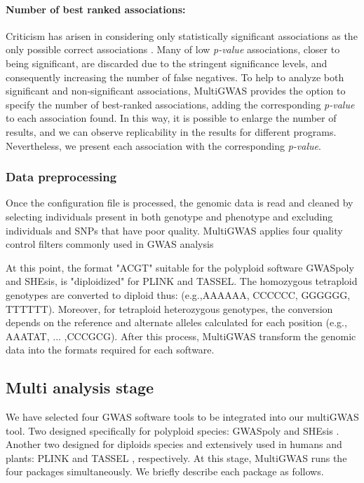 \paragraph{Number of best ranked associations:}
Criticism has arisen in considering only statistically significant associations as the only possible correct associations \cite{Thomson2011,Kaler2019}. Many of low \emph{p-value} associations, closer to being significant, are discarded due to the stringent significance levels, and consequently increasing the number of false negatives. To help to analyze both significant and non-significant associations, MultiGWAS provides the option to specify the number of best-ranked associations, adding the corresponding  \emph{p-value} to each association found.  In this way, it is possible to enlarge the number of results, and we can observe replicability in the results for different programs. Nevertheless, we present each association with the corresponding \emph{p-value}.%

\subsubsection{Data preprocessing}
Once the configuration file is processed, the genomic data is read and cleaned by selecting individuals present in both genotype and phenotype and excluding individuals and SNPs that have poor quality. MultiGWAS applies four quality control filters commonly used in GWAS analysis

At this point, the format   "ACGT" suitable for the polyploid software GWASpoly and SHEsis, is "diploidized" for PLINK and TASSEL. The homozygous tetraploid genotypes are converted to diploid thus: (e.g.,AAAA\textrightarrow AA, CCCC\textrightarrow CC, GGGG\textrightarrow GG,
TTTT\textrightarrow TT). Moreover, for tetraploid heterozygous genotypes, the conversion depends on the reference and alternate alleles calculated for each position (e.g., AAAT\textrightarrow AT,
... ,CCCG\textrightarrow CG). After this process, MultiGWAS transform the genomic data into the formats required for each software.



\subsection{Multi analysis stage} 

We have selected four GWAS software tools to be integrated into our multiGWAS tool. Two designed specifically for polyploid species: GWASpoly \cite{Rosyara2016} and SHEsis \cite{Yong2006}. Another two designed for diploids species and extensively used in humans and plants: PLINK \cite{Purcell2007,Chang2015} and TASSEL \cite{Bradbury2007}, respectively.  At this stage, MultiGWAS runs the four packages simultaneously. We briefly describe each package as follows.

